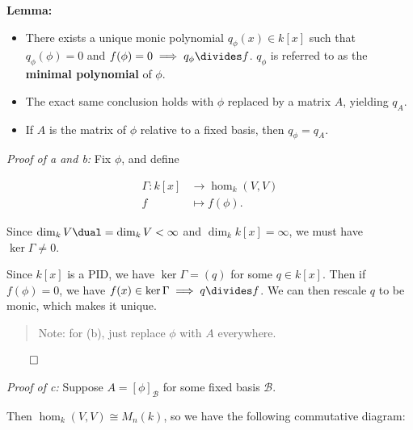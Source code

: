 \textbf{Lemma:}

\begin{itemize}
\item
  There exists a unique monic polynomial \(q_\phi(x) \in k[x]\) such
  that \(q_\phi(\phi) = 0\) and
  \(f(\phi) = 0 \implies q_\phi \divides f\). \(q_\phi\) is referred to
  as the \textbf{minimal polynomial} of \(\phi\).
\item
  The exact same conclusion holds with \(\phi\) replaced by a matrix
  \(A\), yielding \(q_A\).
\item
  If \(A\) is the matrix of \(\phi\) relative to a fixed basis, then
  \(q_\phi = q_A\).
\end{itemize}

\emph{Proof of a and b:} Fix \(\phi\), and define

\begin{align*}
\Gamma: k[x] &\to \hom_k(V, V) \\
f &\mapsto f(\phi)
.\end{align*}

Since \(\dim_k V\dual = \dim_k V < \infty\) and
\(\dim_k k[x] = \infty\), we must have \(\ker \Gamma \neq 0\).

Since \(k[x]\) is a PID, we have \(\ker \Gamma = (q)\) for some
\(q\in k[x]\). Then if \(f(\phi) = 0\), we have
\(f(x) \in \ker \Gamma \implies q \divides f\). We can then rescale
\(q\) to be monic, which makes it unique.

\begin{quote}
Note: for (b), just replace \(\phi\) with \(A\) everywhere.
\end{quote}

\(\qed\)

\emph{Proof of c:} Suppose \(A = [\phi]_\mathcal{B}\) for some fixed
basis \(\mathcal B\).

Then \(\hom_k(V, V) \cong M_n(k)\), so we have the following commutative
diagram:

\begin{center}
\end{center}

